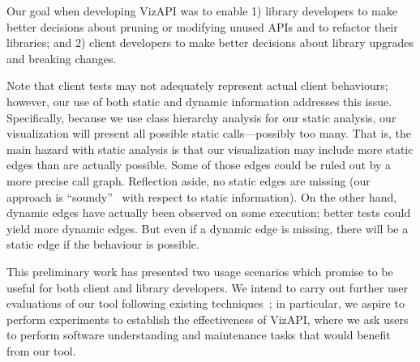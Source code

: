 \label{sec:discussion}
Our goal when developing VizAPI was to enable 1) library developers to make better
decisions about pruning or modifying unused APIs and to refactor their
libraries; and 2) client developers to make better decisions about library
upgrades and breaking changes.


Note that client tests may
not adequately represent actual client behaviours; however, our use of both static
and dynamic information addresses this issue. Specifically, because we use
class hierarchy analysis for our static analysis, our visualization will present
all possible static calls---possibly too many. 
That is, the main hazard with static analysis is that our visualization may include more
static edges than are actually possible. Some of those edges could be ruled out by a more
precise call graph. Reflection aside, no static edges
are missing (our approach is ``soundy''~\cite{livshits15:_in_defen_sound} with respect to static information). On the other hand, dynamic edges have actually been observed
on some execution; better tests could yield more dynamic edges. But even if
a dynamic edge is missing, there will be a static edge if the behaviour is possible.

This preliminary work has presented two usage scenarios which promise to be useful for both client and library
developers. We intend to carry out further user evaluations of our tool following
existing techniques~\cite{merino18:_system_liter_review_softw_visual_evaluat}; in
particular, we aspire to perform experiments to establish the
effectiveness of VizAPI, where we ask users to perform software
understanding and maintenance tasks that would benefit from our tool.


